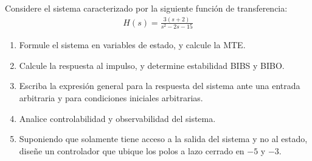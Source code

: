\documentclass[
  11pt,
  letterpaper,
   addpoints,
  ]{exam}
\begin{document}
\begin{questions}
    \question Considere el sistema caracterizado por la siguiente función de transferencia:
    \begin{align}
    H(s) = \frac{3(s + 2)}{s^2 - 2s - 15}
    \end{align}
    \begin{enumerate}
        \item Formule el sistema en variables de estado, y calcule la MTE.
        \item Calcule la respuesta al impulso, y determine estabilidad BIBS y BIBO.
        \item Escriba la expresión general para la respuesta del sistema ante una entrada arbitraria y para condiciones iniciales arbitrarias.
        \item Analice controlabilidad y observabilidad del sistema.
        \item Suponiendo que solamente tiene acceso a la salida del sistema y no al estado, diseñe un controlador que ubique los polos a lazo cerrado en $-5$ y $-3$.
    \end{enumerate}
    \begin{solution}

\end{solution}
\end{questions}
\end{document}
